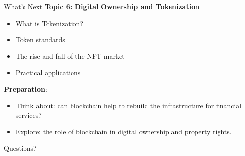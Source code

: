 \documentclass[10pt]{beamer}
\begin{document}
\begin{frame}{What's Next}
  \textbf{Topic 6: Digital Ownership and Tokenization}
  \begin{itemize}
    \item What is Tokenization?
    \item Token standards
    \item The rise and fall of the NFT market
    \item Practical applications
  \end{itemize}
  
  \vspace{1em}
  \textbf{Preparation}:
  \begin{itemize}
    \item Think about: can blockchain help to rebuild the infrastructure for financial services?
    \item Explore: the role of blockchain in digital ownership and property rights.
  \end{itemize}
\end{frame}

\begin{frame}[plain]
  \vfill
  \begin{center}
    {\Large Questions?}
  \end{center}
  \vfill
\end{frame}
\end{document}
